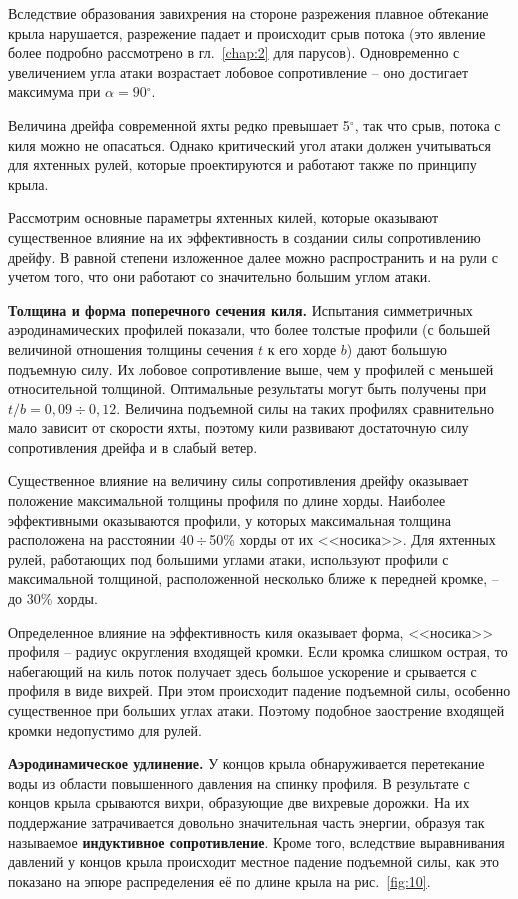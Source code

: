 \documentclass[a4paper, 12pt, twoside, final, book, russian, fittopage, cyremdash]{ncc}
\newcommand{\gr}{\ensuremath{^\circ}\xspace}
\newcommand{\otdo}{\,\ensuremath{\div}\,}
\newcommand{\motdo}{\div}
\begin{document}
Вследствие образования завихрения на стороне разрежения плавное обтекание крыла нарушается, разрежение падает и происходит срыв потока (это явление более подробно рассмотрено в гл.~\ref{chap:2} для парусов). Одновременно с увеличением угла атаки возрастает лобовое сопротивление \--- оно достигает максимума при $\alpha = 90\gr$.

Величина дрейфа современной яхты редко превышает 5\gr, так что срыв, потока с киля можно не опасаться. Однако критический угол атаки должен учитываться для яхтенных рулей, которые проектируются и работают также по принципу крыла. 

Рассмотрим основные параметры яхтенных килей, которые оказывают существенное влияние на их эффективность в создании силы сопротивлению дрейфу. В равной степени изложенное далее можно распространить и на рули с учетом того, что они работают со значительно большим углом атаки.

\textbf{Толщина и форма поперечного сечения киля.} Испытания симметричных аэродинамических профилей показали, что более толстые профили (с большей величиной отношения толщины сечения $t$ к его хорде $b$) дают большую подъемную силу. Их лобовое сопротивление выше, чем у профилей с меньшей относительной толщиной. Оптимальные результаты могут быть получены при $t/b = 0,09 \motdo 0,12$. Величина подъемной силы на таких профилях сравнительно мало зависит от скорости яхты, поэтому кили развивают достаточную силу сопротивления дрейфа и в слабый ветер. 

Существенное влияние на величину силы сопротивления дрейфу оказывает положение максимальной толщины профиля по длине хорды. Наиболее эффективными оказываются профили, у которых максимальная толщина расположена на расстоянии 40\otdo 50\% хорды от их <<носика>>. Для яхтенных рулей, работающих под большими углами атаки, используют профили с максимальной толщиной, расположенной несколько ближе к передней кромке, \--- до 30\% хорды.

Определенное влияние на эффективность киля оказывает форма, <<носика>> профиля \--- радиус округления входящей кромки. Если кромка слишком острая, то набегающий на киль поток получает здесь большое ускорение и срывается с профиля в виде вихрей. При этом происходит падение подъемной силы, особенно существенное при больших углах атаки. Поэтому подобное заострение входящей кромки недопустимо для рулей. 

\textbf{Аэродинамическое удлинение.} У концов крыла обнаруживается перетекание воды из области повышенного давления на спинку профиля. В результате с концов крыла срываются вихри, образующие две вихревые дорожки. На их поддержание затрачивается довольно значительная часть энергии, образуя так называемое \textbf{индуктивное сопротивление}. Кроме того, вследствие выравнивания давлений у концов крыла происходит местное падение подъемной силы, как это показано на эпюре распределения её по длине крыла на рис.~\ref{fig:10}. 
\end{document}
